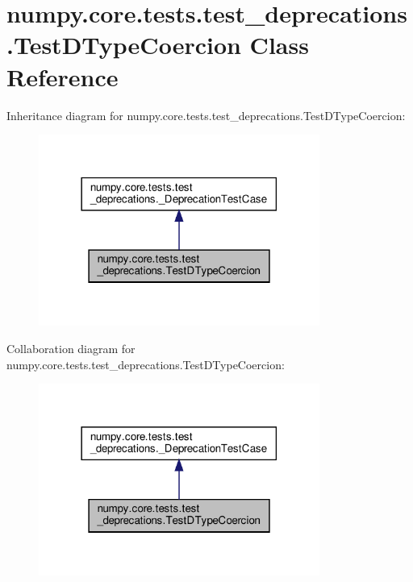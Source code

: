 \hypertarget{classnumpy_1_1core_1_1tests_1_1test__deprecations_1_1TestDTypeCoercion}{}\section{numpy.\+core.\+tests.\+test\+\_\+deprecations.\+Test\+D\+Type\+Coercion Class Reference}
\label{classnumpy_1_1core_1_1tests_1_1test__deprecations_1_1TestDTypeCoercion}


Inheritance diagram for numpy.\+core.\+tests.\+test\+\_\+deprecations.\+Test\+D\+Type\+Coercion\+:
\nopagebreak
\begin{figure}[H]
\begin{center}
\leavevmode
\includegraphics[width=261pt]{classnumpy_1_1core_1_1tests_1_1test__deprecations_1_1TestDTypeCoercion__inherit__graph}
\end{center}
\end{figure}


Collaboration diagram for numpy.\+core.\+tests.\+test\+\_\+deprecations.\+Test\+D\+Type\+Coercion\+:
\nopagebreak
\begin{figure}[H]
\begin{center}
\leavevmode
\includegraphics[width=261pt]{classnumpy_1_1core_1_1tests_1_1test__deprecations_1_1TestDTypeCoercion__coll__graph}
\end{center}
\end{figure}
